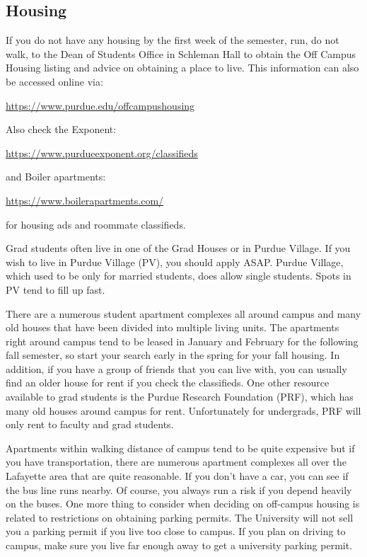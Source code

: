 \subsection{Housing}

If you do not have any housing by the first week of the semester, run, do not walk, to the Dean of Students Office in Schleman Hall to obtain the Off Campus Housing listing and advice on obtaining a place to live. This information can also be accessed online via:

\centerline{\url{https://www.purdue.edu/offcampushousing}}
\vspace{\baselineskip}

Also check the Exponent:

\centerline{\url{https://www.purdueexponent.org/classifieds}}
\vspace{\baselineskip}

and Boiler apartments:

\centerline{\url{https://www.boilerapartments.com/}}
\vspace{\baselineskip}

for housing ads and roommate classifieds.
\vspace{\baselineskip}

Grad students often live in one of the Grad Houses or in Purdue Village. If you wish to live in Purdue Village (PV), you should apply ASAP. Purdue Village, which used to be only for married students, does allow single students. Spots in PV tend to fill up fast.

There are a numerous student apartment complexes all around campus and many old houses that have been divided into multiple living units. The apartments right around campus tend to be leased in January and February for the following fall semester, so start your search early in the spring for your fall housing. In addition, if you have a group of friends that you can live with, you can usually find an older house for rent if you check the classifieds. One other resource available to grad students is the Purdue Research Foundation (PRF), which has many old houses around campus for rent. Unfortunately for undergrads, PRF will only rent to faculty and grad students.

Apartments within walking distance of campus tend to be quite expensive but if you have transportation, there are numerous apartment complexes all over the Lafayette area that are quite reasonable. If you don't have a car, you can see if the bus line runs nearby. Of course, you always run a risk if you depend heavily on the buses. One more thing to consider when deciding on off-campus housing is related to restrictions on obtaining parking permits. The University will not sell you a parking permit if you live too close to campus. If you plan on driving to campus, make sure you live far enough away to get a university parking permit.

